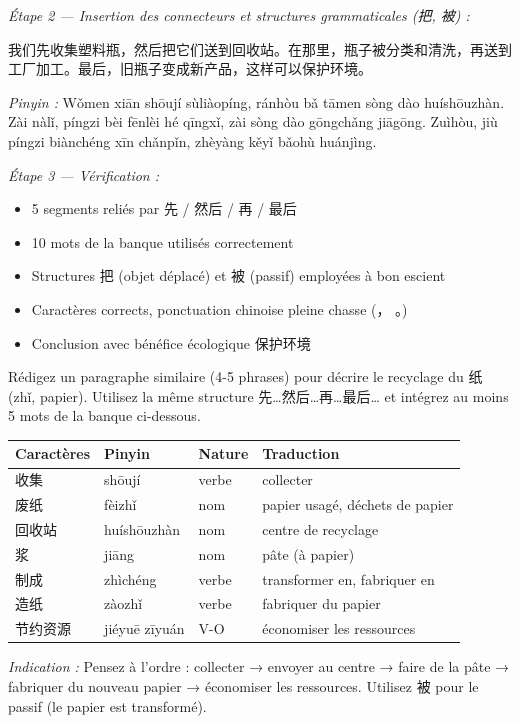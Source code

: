 \documentclass[11pt]{article}
\newcommand{\cle}[1]{{\popxbold\color{popdark}#1}}
\begin{document}
\begin{exoresolu}
\textit{Étape 2 — Insertion des connecteurs et structures grammaticales (把, 被) :}
\begin{zh}
我们先收集塑料瓶，然后把它们送到回收站。在那里，瓶子被分类和清洗，再送到工厂加工。最后，旧瓶子变成新产品，这样可以保护环境。
\end{zh}
\textit{Pinyin :} Wǒmen xiān shōují sùliàopíng, ránhòu bǎ tāmen sòng dào huíshōuzhàn. Zài nàlǐ, píngzi bèi fēnlèi hé qīngxǐ, zài sòng dào gōngchǎng jiāgōng. Zuìhòu, jiù píngzi biànchéng xīn chǎnpǐn, zhèyàng kěyǐ bǎohù huánjìng.

\textit{Étape 3 — Vérification :}
\begin{itemize}
\item[✓] 5 segments reliés par 先 / 然后 / 再 / 最后
\item[✓] 10 mots de la banque utilisés correctement
\item[✓] Structures \cle{把} (objet déplacé) et \cle{被} (passif) employées à bon escient
\item[✓] Caractères corrects, ponctuation chinoise pleine chasse (， 。)
\item[✓] Conclusion avec bénéfice écologique \cle{保护环境}
\end{itemize}
\end{exoresolu}

\begin{exercice}
Rédigez un paragraphe similaire (4-5 phrases) pour décrire le recyclage du \cle{纸} (zhǐ, papier). Utilisez la même structure \cle{先…然后…再…最后…} et intégrez au moins 5 mots de la banque ci-dessous.
\begin{center}
\begin{tabularx}{\linewidth}{|X|X|X|X|}
\hline
\rowcolor{popblueL} Caractères & Pinyin & Nature & Traduction \\ \hline
收集 & shōují & verbe & collecter \\ \hline
废纸 & fèizhǐ & nom & papier usagé, déchets de papier \\ \hline
回收站 & huíshōuzhàn & nom & centre de recyclage \\ \hline
浆 & jiāng & nom & pâte (à papier) \\ \hline
制成 & zhìchéng & verbe & transformer en, fabriquer en \\ \hline
造纸 & zàozhǐ & verbe & fabriquer du papier \\ \hline
节约资源 & jiéyuē zīyuán & V-O & économiser les ressources \\ \hline
\end{tabularx}
\end{center}
\textit{Indication :} Pensez à l'ordre : collecter → envoyer au centre → faire de la pâte → fabriquer du nouveau papier → économiser les ressources. Utilisez \cle{被} pour le passif (le papier est transformé).
\end{exercice}
\end{document}
